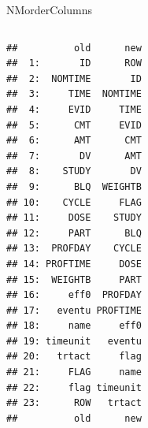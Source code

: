 \documentclass[
  8pt,
  ignorenonframetext,
  aspectratio=169]{beamer}
\begin{document}
\begin{frame}[fragile]{NMorderColumns}
\begin{columns}[T]
\begin{column}{0.48\textwidth}
\begin{verbatim}
##          old      new
##  1:       ID      ROW
##  2:  NOMTIME       ID
##  3:     TIME  NOMTIME
##  4:     EVID     TIME
##  5:      CMT     EVID
##  6:      AMT      CMT
##  7:       DV      AMT
##  8:    STUDY       DV
##  9:      BLQ  WEIGHTB
## 10:    CYCLE     FLAG
## 11:     DOSE    STUDY
## 12:     PART      BLQ
## 13:  PROFDAY    CYCLE
## 14: PROFTIME     DOSE
## 15:  WEIGHTB     PART
## 16:     eff0  PROFDAY
## 17:   eventu PROFTIME
## 18:     name     eff0
## 19: timeunit   eventu
## 20:   trtact     flag
## 21:     FLAG     name
## 22:     flag timeunit
## 23:      ROW   trtact
##          old      new
\end{verbatim}
\end{column}

\normalsize
\end{columns}
\end{frame}
\end{document}
